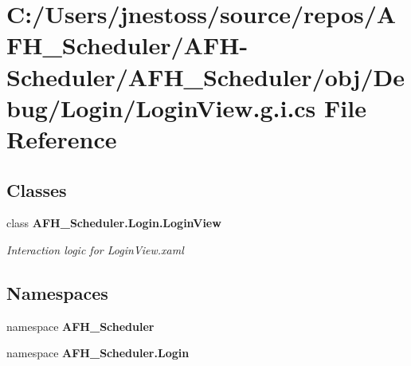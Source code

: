 \section{C\+:/\+Users/jnestoss/source/repos/\+A\+F\+H\+\_\+\+Scheduler/\+A\+F\+H-\/\+Scheduler/\+A\+F\+H\+\_\+\+Scheduler/obj/\+Debug/\+Login/\+Login\+View.g.\+i.\+cs File Reference}
\label{_debug_2_login_2_login_view_8g_8i_8cs}
\subsection*{Classes}
\begin{DoxyCompactItemize}
\item 
class \textbf{ A\+F\+H\+\_\+\+Scheduler.\+Login.\+Login\+View}
\begin{DoxyCompactList}\small\item\em Interaction logic for Login\+View.\+xaml \end{DoxyCompactList}\end{DoxyCompactItemize}
\subsection*{Namespaces}
\begin{DoxyCompactItemize}
\item 
namespace \textbf{ A\+F\+H\+\_\+\+Scheduler}
\item 
namespace \textbf{ A\+F\+H\+\_\+\+Scheduler.\+Login}
\end{DoxyCompactItemize}
